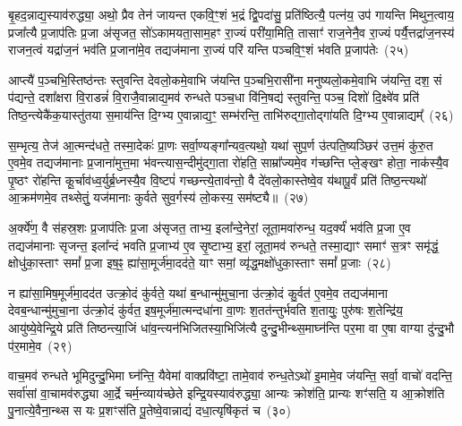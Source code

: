 बृ॒हद॒न्नाद्य॒स्याव॑रुद्ध्या॒ अथो॒ प्रैव तेन॑ जायन्त एकवि॒ꣳ॒शं भ॒द्रं द्वि॒पदा॑सु॒ प्रति॑ष्ठित्यै॒ पत्न॑य॒ उप॑ गायन्ति मिथुन॒त्वाय॒ प्रजा᳚त्यै प्र॒जा\-प॑तिः प्र॒जा अ॑सृजत॒ सो॑\-ऽकामयता॒साम॒हꣳ रा॒ज्यं परी॑या॒मिति॒ तासाꣳ॑ राज॒नेनै॒व रा॒ज्यं पर्यै॒त्तद्रा॑ज॒नस्य॑ राजन॒त्वं यद्रा॑ज॒नं भव॑ति प्र॒जाना॑मे॒व तद्यज॑माना रा॒ज्यं परि॑ यन्ति पञ्चवि॒ꣳ॒शं भ॑वति प्र॒जा\-प॑तेः~(२५)\ip

आप्त्यै॑ प॒ञ्चभि॒स्तिष्ठ॑न्तः स्तुवन्ति देवलो॒कमे॒वाभि ज॑यन्ति प॒ञ्चभि॒रासी॑ना मनुष्यलो॒कमे॒वाभि ज॑यन्ति॒ दश॒ सं प॑द्यन्ते॒ दशा᳚क्षरा वि॒राडन्नं॑ वि॒राजै॒वान्नाद्य॒मव॑ रुन्धते पञ्च॒धा वि॑नि॒षद्य॑ स्तुवन्ति॒ पञ्च॒ दिशो॑ दि॒क्ष्वे॑व प्रति॑ तिष्ठ॒न्त्येकै॑क॒यास्तु॑तया स॒माय॑न्ति दि॒ग्भ्य ए॒वान्नाद्य॒ꣳ॒ सम्भ॑रन्ति॒ ताभि॑रुद्गा॒तोद्गा॑यति दि॒ग्भ्य ए॒वान्नाद्यम्᳚~(२६)\ip

स॒म्भृत्य॒ तेज॑ आ॒त्मन्द॑धते॒ तस्मा॒देकः॑ प्रा॒णः सर्वा॒ण्यङ्गा᳚न्यव॒त्यथो॒ यथा॑ सुप॒र्ण उ॑त्पति॒ष्यञ्छिर॑ उत्त॒मं कु॑रु॒त ए॒वमे॒व तद्यज॑मानाः प्र॒जाना॑मुत्त॒मा भ॑वन्त्यास॒न्दीमु॑द्गा॒ता रो॑हति॒ साम्रा᳚ज्यमे॒व ग॑च्छन्ति प्ले॒ङ्खꣳ होता॒ नाक॑स्यै॒व पृ॒ष्ठꣳ रो॑हन्ति कू॒र्चाव॑ध्व॒र्युर्ब्र॒ध्नस्यै॒व वि॒ष्टपं॑ गच्छन्त्ये॒ताव॑न्तो॒ वै दे॑वलो॒कास्तेष्वे॒व य॑थापू॒र्वं प्रति॑ तिष्ठ॒न्त्यथो॑ आ॒क्रम॑णमे॒व तथ्सेतुं॒ यज॑मानाः कुर्वते सुव॒र्गस्य॑ लो॒कस्य॒ सम॑ष्ट्यै॥~(२७)\ip

{\anuvakamend[{सद॑सः सप्तद॒शं प्र॒जा\-प॑तेर्गायति दि॒ग्भ्य ए॒वान्नाद्यं॒ प्रत्येका॑\-दश च}]}

अ॒र्क्ये॑ण॒ वै स॑हस्र॒शः प्र॒जा\-प॑तिः प्र॒जा अ॑सृजत॒ ताभ्य॒ इला᳚न्दे॒नेरां॒ लूता॒मवा॑रुन्ध॒ यद॒र्क्यं॑ भव॑ति प्र॒जा ए॒व तद्यज॑मानाः सृजन्त॒ इला᳚न्दं भवति प्र॒जाभ्य॑ ए॒व सृ॒ष्टाभ्य॒ इरां॒ लूता॒मव॑ रुन्धते॒ तस्मा॒द्याꣳ समाꣳ॑ स॒त्रꣳ समृ॑द्धं॒ क्षोधु॑का॒स्ताꣳ समां᳚ प्र॒जा इष॒ꣴ॒ ह्या॑सा॒मूर्ज॑मा॒दद॑ते॒ याꣳ समां॒ व्यृ॑द्ध॒मक्षो॑धुका॒स्ताꣳ समां᳚ प्र॒जाः~(२८)\ip

न ह्या॑सा॒मिष॒मूर्ज॑मा॒दद॑त उत्क्रो॒दं कु॑र्वते॒ यथा॑ ब॒न्धान्मु॑मुचा॒ना उ॑त्क्रो॒दं कु॒र्वत॑ ए॒वमे॒व तद्यज॑माना देवब॒न्धान्मु॑मुचा॒ना उ॑त्क्रो॒दं कु॑र्वत॒ इष॒मूर्ज॑मा॒त्मन्दधा॑ना वा॒णः श॒तत॑न्तुर्भवति श॒तायुः॒ पुरु॑षः श॒तेन्द्रि॑य॒ आयु॑ष्ये॒वेन्द्रि॒ये प्रति॑ तिष्ठन्त्या॒जिं धा॑व॒न्त्यन॑भिजितस्या॒भिजि॑त्यै दुन्दु॒भीन्थ्स॒माघ्न॑न्ति पर॒मा वा ए॒षा वाग्या दु॑न्दु॒भौ प॑र॒मामे॒व~(२९)\ip

वाच॒मव॑ रुन्धते भूमिदुन्दु॒भिमा घ्न॑न्ति॒ यैवेमां वाक्प्रवि॑ष्टा॒ तामे॒वाव॑ रुन्ध॒ते\-ऽथो॑ इ॒मामे॒व ज॑यन्ति॒ सर्वा॒ वाचो॑ वदन्ति॒ सर्वा॑सां वा॒चामव॑रुद्ध्या आ॒र्द्रे चर्म॒न्व्याय॑च्छेते इन्द्रि॒यस्याव॑रुद्ध्या॒ आन्यः क्रोश॑ति॒ प्रान्यः शꣳ॑सति॒ य आ॒क्रोश॑ति पु॒नात्ये॒वैना॒न्थ्स स यः प्र॒शꣳस॑ति पू॒तेष्वे॒वान्नाद्यं॑ दधा॒त्यृषि॑कृतं च~(३०)\ip

